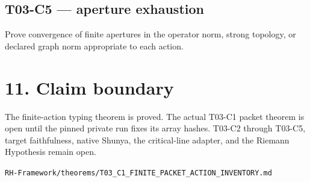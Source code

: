 \hypertarget{t03-c5-aperture-exhaustion}{%
\subsection{T03-C5 --- aperture exhaustion}\label{t03-c5-aperture-exhaustion}}

Prove convergence of finite apertures in the operator norm, strong topology, or
declared graph norm appropriate to each action.

\hypertarget{claim-boundary}{%
\section{11. Claim boundary}\label{claim-boundary}}

The finite-action typing theorem is proved. The actual T03-C1 packet theorem is
open until the pinned private run fixes its array hashes. T03-C2 through T03-C5,
target faithfulness, native Shunya, the critical-line adapter, and the Riemann
Hypothesis remain open.

\begin{flushright}\small\texttt{RH-Framework/theorems/T03\_C1\_FINITE\_PACKET\_ACTION\_INVENTORY.md}\end{flushright}
